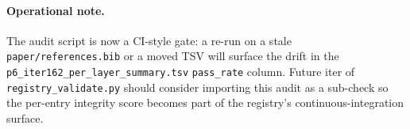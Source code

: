 \paragraph{Operational note.}
The audit script is now a CI-style gate: a re-run on a stale
\texttt{paper/references.bib} or a moved TSV will surface the drift in
the \texttt{p6\_iter162\_per\_layer\_summary.tsv} \texttt{pass\_rate}
column. Future iter of \texttt{registry\_validate.py} should consider
importing this audit as a sub-check so the per-entry integrity score
becomes part of the registry's continuous-integration surface.
